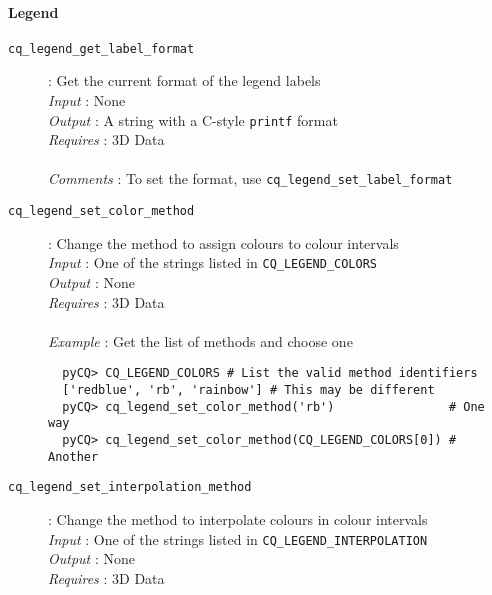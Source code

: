 \documentclass[a4paper,notitlepage,11pt]{article}
\def\Conqtour{\textsc{Conqtour}}
\begin{document}
\paragraph{Legend}
\label{sec:py-function-state-legend}
\index{\Conqtour\ State!Legend}
  
\begin{description}
\item[\texttt{cq\_legend\_get\_label\_format}]: Get the current format of the legend labels\\
  \emph{Input} : None\\
  \emph{Output} : A string with a C-style \texttt{printf} format\\
  \emph{Requires} : 3D Data\\
  \\
  \emph{Comments} : To set the format, use \texttt{cq\_legend\_set\_label\_format}
\end{description}

\begin{description}
\item[\texttt{cq\_legend\_set\_color\_method}]: Change the method to assign colours to colour intervals\\
  \emph{Input} : One of the strings listed in \texttt{CQ\_LEGEND\_COLORS}\\
  \emph{Output} : None\\
  \emph{Requires} : 3D Data\\
  \\
  \emph{Example} : Get the list of methods and choose one
  \begin{verbatim}
  pyCQ> CQ_LEGEND_COLORS # List the valid method identifiers
  ['redblue', 'rb', 'rainbow'] # This may be different
  pyCQ> cq_legend_set_color_method('rb')                # One way
  pyCQ> cq_legend_set_color_method(CQ_LEGEND_COLORS[0]) # Another
  \end{verbatim}
\end{description}

\begin{description}
\item[\texttt{cq\_legend\_set\_interpolation\_method}]: Change the method to interpolate colours in colour intervals\\
  \emph{Input} : One of the strings listed in \texttt{CQ\_LEGEND\_INTERPOLATION}\\
  \emph{Output} : None\\
  \emph{Requires} : 3D Data\\
\end{description}
\end{document}
